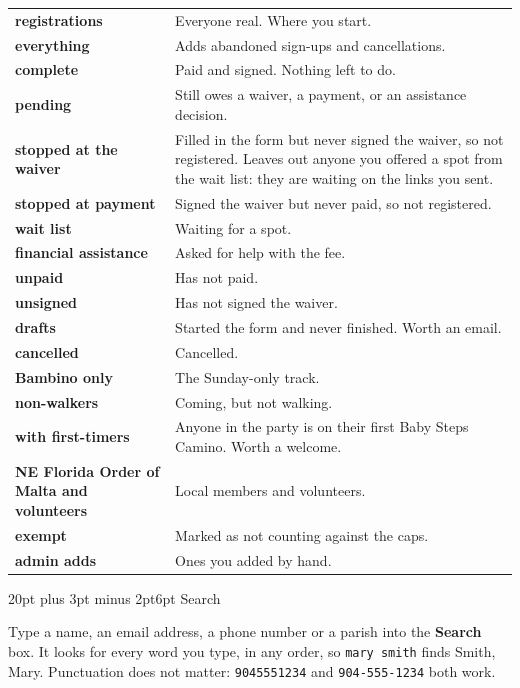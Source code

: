 \documentclass[12pt]{article}
\makeatletter
\renewcommand\subsection{\@startsection{subsection}{2}{0pt}%
  {20pt plus 3pt minus 2pt}{6pt}%
  {\normalfont\large\bfseries\color{ink}}}
\newcommand{\btn}[1]{\textbf{#1}}
\makeatother
\begin{document}
\begin{tabularx}{\linewidth}{@{}L{1.65in}Y@{}}
\toprule
\textbf{registrations} & Everyone real. Where you start. \\
\textbf{everything} & Adds abandoned sign-ups and cancellations. \\
\textbf{complete} & Paid and signed. Nothing left to do. \\
\textbf{pending} & Still owes a waiver, a payment, or an assistance
decision. \\
\textbf{stopped at the waiver} & Filled in the form but never signed
the waiver, so not registered. Leaves out anyone you offered a spot from
the wait list: they are waiting on the links you sent. \\
\textbf{stopped at payment} & Signed the waiver but never paid, so not
registered. \\
\textbf{wait list} & Waiting for a spot. \\
\textbf{financial assistance} & Asked for help with the fee. \\
\textbf{unpaid} & Has not paid. \\
\textbf{unsigned} & Has not signed the waiver. \\
\textbf{drafts} & Started the form and never finished. Worth an email. \\
\textbf{cancelled} & Cancelled. \\
\textbf{Bambino only} & The Sunday-only track. \\
\textbf{non-walkers} & Coming, but not walking. \\
\textbf{with first-timers} & Anyone in the party is on their first Baby
Steps Camino. Worth a welcome. \\
\textbf{NE Florida Order of Malta and volunteers} & Local members and
volunteers. \\
\textbf{exempt} & Marked as not counting against the caps. \\
\textbf{admin adds} & Ones you added by hand. \\
\bottomrule
\end{tabularx}

\subsection{Search}

Type a name, an email address, a phone number or a parish into the
\btn{Search} box. It looks for every word you type, in any order, so
\texttt{mary smith} finds Smith, Mary. Punctuation does not matter:
\texttt{9045551234} and \texttt{904-555-1234} both work.
\end{document}
